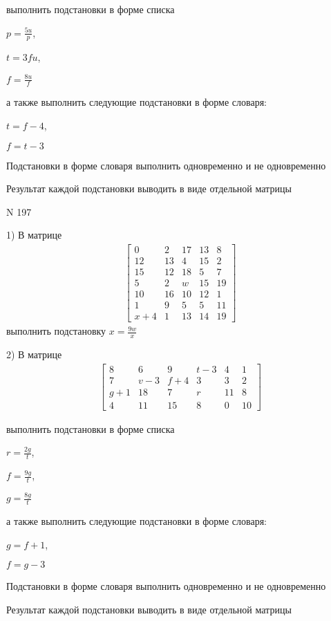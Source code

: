 \documentclass[11pt]{report}
\begin{document}
выполнить подстановки в форме списка

$p=\frac{5 u}{p}$,

$t=3 f u$,

$f=\frac{8 u}{f}$

а также выполнить следующие подстановки в форме словаря:

$t=f - 4$,

$f=t - 3$


    Подстановки в форме словаря выполнить одновременно и не одновременно


    Результат каждой подстановки выводить в виде отдельной матрицы

\newpage
N 197


    1) В матрице
\begin{align*}
\left[\begin{matrix}0 & 2 & 17 & 13 & 8\\12 & 13 & 4 & 15 & 2\\15 & 12 & 18 & 5 & 7\\5 & 2 & w & 15 & 19\\10 & 16 & 10 & 12 & 1\\1 & 9 & 5 & 5 & 11\\x + 4 & 1 & 13 & 14 & 19\end{matrix}\right]
\end{align*}
выполнить подстановку $x=\frac{9 w}{x}$


    2) В матрице
\begin{align*}
\left[\begin{matrix}8 & 6 & 9 & t - 3 & 4 & 1\\7 & v - 3 & f + 4 & 3 & 3 & 2\\g + 1 & 18 & 7 & r & 11 & 8\\4 & 11 & 15 & 8 & 0 & 10\end{matrix}\right]
\end{align*}

выполнить подстановки в форме списка

$r=\frac{2 g}{t}$,

$f=\frac{9 g}{t}$,

$g=\frac{8 g}{t}$

а также выполнить следующие подстановки в форме словаря:

$g=f + 1$,

$f=g - 3$


    Подстановки в форме словаря выполнить одновременно и не одновременно


    Результат каждой подстановки выводить в виде отдельной матрицы
\end{document}
